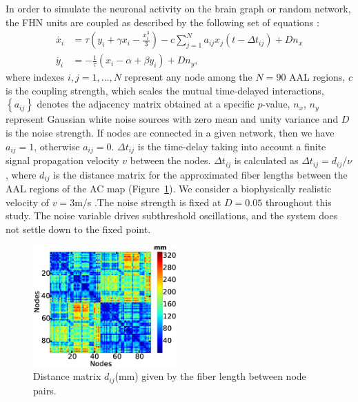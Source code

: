 \documentclass[fleqn,10pt]{wlpeerj}
\begin{document}
In order to simulate the neuronal activity on the brain graph or random network, the FHN units are coupled as
described by the following set of equations \citep{GHO08, VUK13}:
 \begin{subequations}\label{eq:FHN_network}
 \begin{align}
   \dot{x_i} &= \tau \left( y_i + \gamma x_i - \frac{x_i^3}{3} \right) -c \sum_{j=1}^N a_{ij}x_j\left(t - \Delta 
t_{ij}\right) +Dn_x \label{eqn: frobenius 17}\\  
  \dot{y_i} &= -\frac{1}{\tau} \left(x_i - \alpha + \beta y_i\right) +Dn_y, \label{eqn:frobenius 18} 
\end{align} 
\end{subequations}
where indexes $i, j=1,\dots,N$ represent any node among the $N=90$ AAL regions, $c$ is the coupling strength, which
scales the mutual time-delayed interactions, $\left\{a_{ij}\right\}$ denotes the adjacency matrix obtained at a specific
$p$-value, $n_x$, $n_y$ represent Gaussian white noise sources with zero mean and unity variance and $D$ is the noise
strength. If nodes are connected in a given network, then we have $a_{ij}=1$, otherwise $a_{ij}=0$. $\Delta t_{ij}$ is
the time-delay taking into account a finite signal propagation velocity $v$ between the nodes. $\Delta t_{ij}$ is
calculated as $\Delta t_{ij}=d_{ij}/\nu$ \citep{GHO08, GHO08a, DEC09}, where $d_{ij}$ is the distance matrix for the
approximated fiber lengths between the AAL regions of the AC map \citep{ITU08} (Figure~\ref{fig:d_ij}). We consider a
biophysically realistic velocity of $v=3$m/s \cite{GHO08a}.The noise
strength is fixed at $D=0.05$ throughout this study. The noise variable drives subthreshold oscillations, and the system
does not settle down to the fixed point.

\begin{figure}[t!]
         \centering
	 \includegraphics[width=0.49\textwidth]{Figures/distance_ACM_pyt} 
	\caption{Distance matrix $d_{ij}$(mm) given by the fiber length between node pairs.}
\label{fig:d_ij}
\end{figure}
\end{document}
